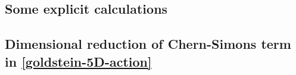 \documentclass[12pt,twoside]{book}
\begin{document}
\begin{appendices}
\newpage
\thispagestyle{empty}

\chapter{Some explicit calculations}


\section{Dimensional reduction of Chern-Simons term in \eqref{goldstein-5D-action}}
\label{app:DR-CS-GJ}


\end{appendices}
\end{document}
